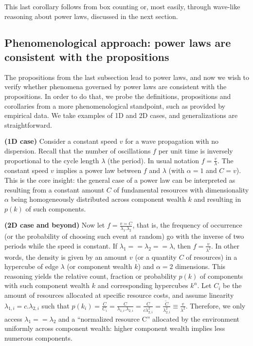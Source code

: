 \documentclass[a4paper, 11pt]{article} %
\begin{document}
This last corollary follows from box counting or, most easily,
through wave-like reasoning about power laws, discussed in the next section.

\subsection{Phenomenological approach: power laws are consistent with the propositions}\label{sec:phen}

The propositions from the last subsection lead to power laws, and now we wish to verify whether phenomena governed by power laws are consistent with the propositions. In order to do that, we probe the definitions, propositions and corollaries from a more phenomenological standpoint, such as provided by empirical data. We take examples of 1D and 2D cases, and generalizations are straightforward.  


{\bf (1D case)} Consider a constant speed $v$ for a wave propagation with no dispersion.
Recall that the number of oscillations $f$ per unit time is
inversely proportional to the cycle length $\lambda$ (the period).
In usual notation $f=\frac{v}{\lambda}$.
The constant speed $v$ implies a power law between 
$f$ and $\lambda$ (with $\alpha=1$ and $C=v$).
This is the core insight: the general case of a power law can
be interpreted as resulting from a constant amount $C$ of
fundamental resources with dimensionality $\alpha$ 
being homogeneously distributed across
component wealth $k$ and resulting in $p(k)$ of such components.

{\bf (2D case and beyond)} Now let $f=\frac{v=C}{\lambda_1 . \lambda_2}$, that is, the frequency of occurrence
(or the probability of choosing such event at random) go with the inverse of two periods while the speed is constant. 
If $\lambda_1==\lambda_2==\lambda$, then $f=\frac{v}{\lambda^2}$.
In other words, the density is given by an amount $v$
(or a quantity $C$ of resources) in a hypercube of
edge $\lambda$ (or component wealth $k$)
and $\alpha=2$ dimensions.
This reasoning yields the relative count, fraction or probability $p(k)$ of components with such component wealth $k$ and corresponding hypercubes $k^\alpha$.
Let $C_i$ be the amount of resources allocated at
specific resource costs,
and assume linearity $\lambda_{1,i}=c.\lambda_{2,i}$
such that
$p(k_i)=\frac{C}{C_i}=\frac{C}{\lambda_{1,i}.\lambda_{2,i}}=
\frac{C}{c\lambda_{2,i}^2}=\frac{\widetilde{C}}{\lambda_{2,i}^2}\equiv\frac{v}{\lambda^2}$.
Therefore, we only access $\lambda_1==\lambda_2$ and a ``normalized resource C'' allocated by the environment uniformly across component wealth: higher component wealth implies less numerous components. 
\end{document}
